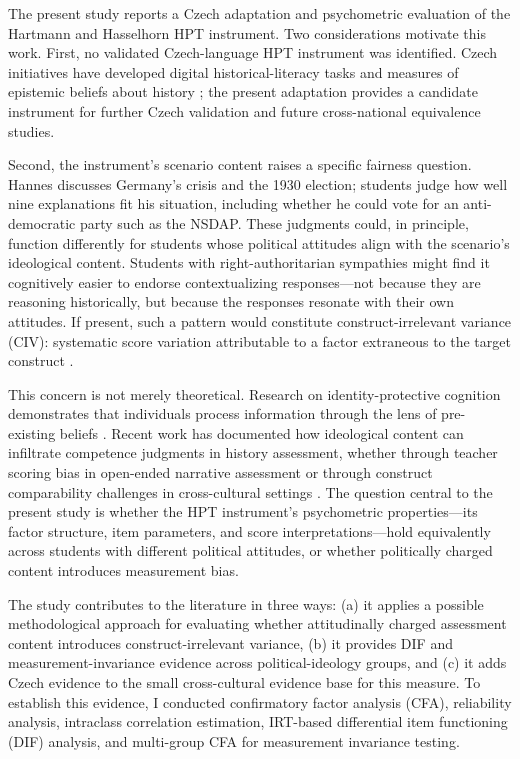 \documentclass[PCJ,Unicode,screen,mode=plain]{cedram}
\begin{document}
The present study reports a Czech adaptation and psychometric evaluation of the Hartmann and Hasselhorn HPT instrument. Two considerations motivate this work. First, no validated Czech-language HPT instrument was identified. Czech initiatives have developed digital historical-literacy tasks and measures of epistemic beliefs about history \citep{Cinatl_et_al2021Historicka,Ripka_et_al2024Epistemic}; the present adaptation provides a candidate instrument for further Czech validation and future cross-national equivalence studies.

Second, the instrument's scenario content raises a specific fairness question. Hannes discusses Germany's crisis and the 1930 election; students judge how well nine explanations fit his situation, including whether he could vote for an anti-democratic party such as the NSDAP. These judgments could, in principle, function differently for students whose political attitudes align with the scenario's ideological content. Students with right-authoritarian sympathies might find it cognitively easier to endorse contextualizing responses---not because they are reasoning historically, but because the responses resonate with their own attitudes. If present, such a pattern would constitute construct-irrelevant variance (CIV): systematic score variation attributable to a factor extraneous to the target construct \citep{AERA2014Standards,Messick1995Validity}.

This concern is not merely theoretical. Research on identity-protective cognition demonstrates that individuals process information through the lens of pre-existing beliefs \citep{Jost2003,Kahan2017}. Recent work has documented how ideological content can infiltrate competence judgments in history assessment, whether through teacher scoring bias in open-ended narrative
assessment \citep{Alven2019Bias} or through construct comparability challenges in cross-cultural settings \citep{Badham_et_al2025Construct}. The question central to the present study is whether the HPT instrument's psychometric properties---its factor structure, item parameters, and score interpretations---hold equivalently across students with different political attitudes, or whether politically charged content introduces measurement bias.

The study contributes to the literature in three ways: (a) it applies a possible methodological approach for evaluating whether attitudinally charged assessment content introduces construct-irrelevant variance, (b) it provides DIF and measurement-invariance evidence across political-ideology groups, and (c) it adds Czech evidence to the small cross-cultural evidence base for this measure. To establish this evidence, I conducted confirmatory factor analysis (CFA), reliability analysis, intraclass correlation estimation, IRT-based differential item functioning (DIF) analysis, and multi-group CFA for measurement invariance testing.
\end{document}
